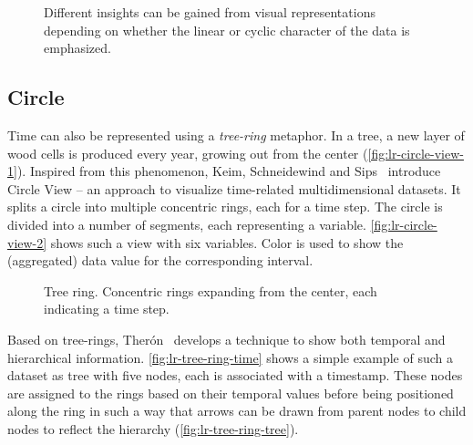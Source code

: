\begin{figure}[!htb]
\centering
{}
\hfill
{}
\hfill
{}
\caption{Different insights can be gained from visual representations depending on whether the linear or cyclic character of the data is emphasized. }
\label{fig:lr-spiral-all}
\end{figure}

\subsection{Circle}
Time can also be represented using a \emph{tree-ring} metaphor. In a tree, a new layer of wood cells is produced every year, growing out from the center (\autoref{fig:lr-circle-view-1}). Inspired from this phenomenon, Keim, Schneidewind and Sips~\cite{Keim2004} introduce Circle View -- an approach to visualize time-related multidimensional datasets. It splits a circle into multiple concentric rings, each for a time step. The circle is divided into a number of segments, each representing a variable. \autoref{fig:lr-circle-view-2} shows such a view with six variables. Color is used to show the (aggregated) data value for the corresponding interval.

\begin{figure}[!htb]
\centering
{}
\hfill
{}
\caption{Tree ring. Concentric rings expanding from the center, each indicating a time step.}
\label{fig:lr-circle-view}
\end{figure}

Based on tree-rings, Therón~\cite{Theron2006} develops a technique to show both temporal and hierarchical information. \autoref{fig:lr-tree-ring-time} shows a simple example of such a dataset as tree with five nodes, each is associated with a timestamp. These nodes are assigned to the rings based on their temporal values before being positioned along the ring in such a way that arrows can be drawn from parent nodes to child nodes to reflect the hierarchy (\autoref{fig:lr-tree-ring-tree}).

